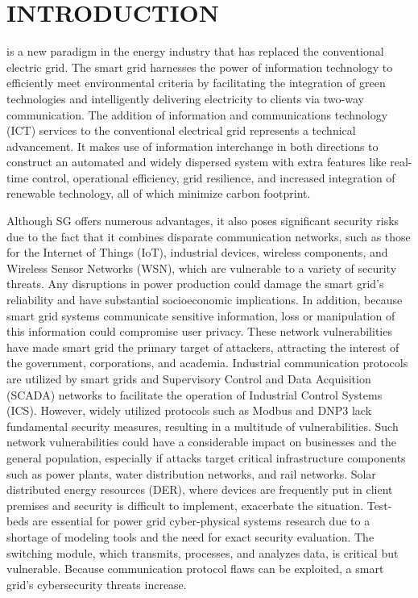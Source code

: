 \documentclass[letterpaper,10pt,conference]{IEEEtran}
\begin{document}
\section{INTRODUCTION}
 is a new paradigm in the energy industry that has replaced the conventional electric grid. The smart grid harnesses the power of information technology to efficiently meet environmental criteria by facilitating the integration of green technologies and intelligently delivering electricity to clients via two-way communication. The addition of information and communications technology (ICT) services to the conventional electrical grid represents a technical advancement. It makes use of information interchange in both directions to construct an automated and widely dispersed system with extra features like real-time control, operational efficiency, grid resilience, and increased integration of renewable technology, all of which minimize carbon footprint.

Although SG offers numerous advantages, it also poses significant security risks due to the fact that it combines disparate communication networks, such as those for the Internet of Things (IoT), industrial devices, wireless components, and Wireless Sensor Networks (WSN), which are vulnerable to a variety of security threats. Any disruptions in power production could damage the smart grid's reliability and have substantial socioeconomic implications. In addition, because smart grid systems communicate sensitive information, loss or manipulation of this information could compromise user privacy. These network vulnerabilities have made smart grid the primary target of attackers, attracting the interest of the government, corporations, and academia. Industrial communication protocols are utilized by smart grids and Supervisory Control and Data Acquisition (SCADA) networks to facilitate the operation of Industrial Control Systems (ICS)\cite{R1}. However, widely utilized protocols such as Modbus and DNP3 lack fundamental security measures, resulting in a multitude of vulnerabilities. Such network vulnerabilities could have a considerable impact on businesses and the general population, especially if attacks target critical infrastructure components such as power plants, water distribution networks, and rail networks. Solar distributed energy resources (DER), where devices are frequently put in client premises and security is difficult to implement, exacerbate the situation. Test-beds are essential for power grid cyber-physical systems research due to a shortage of modeling tools and the need for exact security evaluation. The switching module, which transmits, processes, and analyzes data, is critical but vulnerable. Because communication protocol flaws can be exploited, a smart grid's cybersecurity threats increase.  
\end{document}
